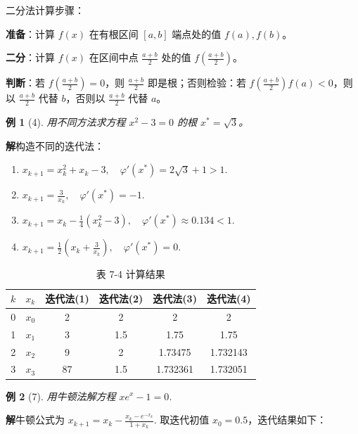\documentclass[a4paper,12pt]{ctexart}
\theoremstyle{exampleStyle}
\newtheorem*{example}{例}
\newcommand{\solution}{\par\noindent\textbf{解}\quad}
\begin{document}
二分法计算步骤：
\begin{description}[style=multiline, leftmargin=3em]
    \item[步骤 1] \textbf{准备}：计算 $f(x)$ 在有根区间 $[a, b]$ 端点处的值 $f(a), f(b)$。
    \item[步骤 2] \textbf{二分}：计算 $f(x)$ 在区间中点 $\frac{a+b}{2}$ 处的值 $f\left(\frac{a+b}{2}\right)$。
    \item[步骤 3] \textbf{判断}：若 $f\left(\frac{a+b}{2}\right)=0$，则 $\frac{a+b}{2}$ 即是根；否则检验：若 $f\left(\frac{a+b}{2}\right)f(a) < 0$，则以 $\frac{a+b}{2}$ 代替 $b$，否则以 $\frac{a+b}{2}$ 代替 $a$。
\end{description}

\begin{example}[4]
用不同方法求方程 $x^2 - 3 = 0$ 的根 $x^* = \sqrt{3}$。
\end{example}

\solution 构造不同的迭代法：
\begin{enumerate}[label=(\arabic*)]
    \item $x_{k+1} = x_k^2 + x_k - 3, \quad \varphi'(x^*) = 2\sqrt{3} + 1 > 1$.
    \item $x_{k+1} = \frac{3}{x_k}, \quad \varphi'(x^*) = -1$.
    \item $x_{k+1} = x_k - \frac{1}{4}(x_k^2 - 3), \quad \varphi'(x^*) \approx 0.134 < 1$.
    \item $x_{k+1} = \frac{1}{2} \left( x_k + \frac{3}{x_k} \right), \quad \varphi'(x^*) = 0$.
\end{enumerate}

\begin{table}[H]
\centering
\caption*{表 7-4 计算结果}
\begin{tabular}{c c c c c c}
\toprule
$k$ & $x_k$ & 迭代法(1) & 迭代法(2) & 迭代法(3) & 迭代法(4) \\
\midrule
0 & $x_0$ & 2 & 2 & 2 & 2 \\
1 & $x_1$ & 3 & 1.5 & 1.75 & 1.75 \\
2 & $x_2$ & 9 & 2 & 1.73475 & 1.732143 \\
3 & $x_3$ & 87 & 1.5 & 1.732361 & 1.732051 \\
\bottomrule
\end{tabular}
\end{table}

\begin{example}[7]
用牛顿法解方程 $xe^x - 1 = 0$.
\end{example}

\solution 牛顿公式为
$x_{k+1} = x_k - \frac{x_k - e^{-x_k}}{1 + x_k}$. 取迭代初值 $x_0 = 0.5$，迭代结果如下：
\end{document}
